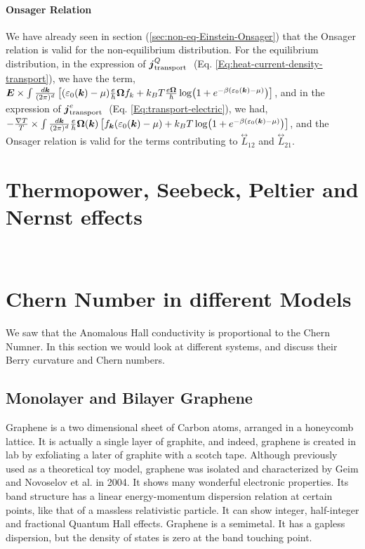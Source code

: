 \documentclass{report}
\renewcommand\vec[1]{\ensuremath\boldsymbol{#1}} %
\begin{document}
\subsubsection{Onsager Relation}
We have already seen in section (\ref{sec:non-eq-Einstein-Onsager}) that the Onsager relation is valid for the non-equilibrium distribution. For the equilibrium distribution, in the expression of $\vec{j}_{\text {transport }}^{Q}$ (Eq. \eqref{Eq:heat-current-density-transport}), we have the term, $\vec{E} \times \int \frac{d\vec{k}}{(2\pi)^d} \left[(\varepsilon_0(\vec{k})-\mu) \frac{e}{\hbar} \vec{\Omega} f_{k} + k_{B} T \frac{e \vec{\Omega}}{\hbar} \log(1 + e^{-\beta(\varepsilon_0(\vec{k}) - \mu)})\right]$, and in the expression of $\vec{j}_{\text {transport }}^{e}$ (Eq. \eqref{Eq:transport-electric}), we had, $-\frac{\nabla T}{T}  \times \int  \frac{d\vec{k}}{(2\pi)^d} \frac{e}{\hbar} \vec{\Omega}(\vec{k}) \left[f_{\vec{k}} (\varepsilon_0(\vec{k}) - \mu) + k_B T \log(1 + e^{-\beta(\varepsilon_0(\vec{k}) - \mu)})\right]$, and the Onsager relation is valid for the terms contributing to $\stackrel{\leftrightarrow}{L}_{12}$ and $\stackrel{\leftrightarrow}{L}_{21}$.
\chapter{Thermopower, Seebeck, Peltier and Nernst effects}~\label{chap:Seebeck-Peltier-Nernst}

\chapter{Chern Number in different Models}\label{chap:ChernNumber}
We saw that the Anomalous Hall conductivity is proportional to the Chern Numner. In this section we would look at different systems, and discuss their Berry curvature and Chern numbers.
\section{Monolayer and Bilayer Graphene}
Graphene is a two dimensional sheet of Carbon atoms, arranged in a honeycomb lattice. It is actually a single layer of graphite, and indeed, graphene is created in lab by exfoliating a later of graphite with a scotch tape. Although previously used as a theoretical toy model, graphene was isolated and characterized by Geim and Novoselov et al. \cite{NovoselovGeimGraphene666} in 2004. It shows many wonderful electronic properties. Its band structure has a linear energy-momentum dispersion \cite{NovoselovGrapheneDirac2005} relation at certain points, like that of a massless relativistic particle. It can show integer, half-integer \cite{Zhang2005GrapheneQHEBerry} and fractional \cite{Bolotin2009GrapheneFQHE} Quantum Hall effects. Graphene is a semimetal. It has a gapless dispersion, but the density of states is zero at the band touching point.
\end{document}

